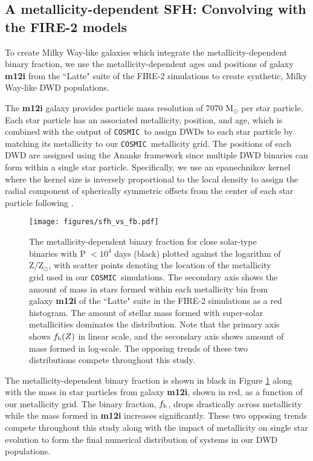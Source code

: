 \documentclass[twocolumn, linenumbers]{aastex631}
\newcommand{\cosmic}{\texttt{COSMIC}}
\begin{document}
\subsection{A metallicity-dependent SFH: Convolving with the FIRE-2 models}
\label{sec:FIRE}
To create Milky Way-like galaxies which integrate the metallicity-dependent binary fraction, we use the metallicity-dependent ages and positions of galaxy \textbf{m12i} from the ``Latte" suite of the FIRE-2 simulations \citep{Hopkins2015, Wetzel2016, Hopkins2018} to create synthetic, Milky Way-like DWD populations. 

The \textbf{m12i} galaxy provides particle mass resolution of 7070 M$_\odot$ per star particle. Each star particle has an associated metallicity, position, and age, which is combined with the output of \cosmic\ to assign DWDs to each star particle by matching its metallicity to our \cosmic\ metallicity grid. The positions of each DWD are assigned using the Ananke framework since multiple DWD binaries can form within a single star particle. Specifically, we use an epanechnikov kernel where the kernel size is inversely proportional to the local density to assign the radial component of spherically symmetric offsets from the center of each star particle following \citet{Sanderson2020}. 

\begin{figure}
	\texttt{[image: figures/sfh\_vs\_fb.pdf]}
    \caption{The metallicity-dependent binary fraction for close solar-type binaries with P $< 10^4$ days (black) plotted against the logarithm of Z/Z$_\odot$, with scatter points denoting the location of the metallicity grid used in our \cosmic\ simulations. The secondary axis shows the amount of mass in stars formed within each metallicity bin from galaxy \textbf{m12i} of the ``Latte" suite in the FIRE-2 simulations as a red histogram. The amount of stellar mass formed with super-solar metallicities dominates the distribution. Note that the primary axis shows $f_{\rm{b}}(Z)$ in linear scale, and the secondary axis shows amount of mass formed in log-scale. The opposing trends of these two distributions compete throughout this study.}
    \label{fig:sfh_vs_fb}
\end{figure}

The metallicity-dependent binary fraction is shown in black in Figure \ref{fig:sfh_vs_fb} along with the mass in star particles from galaxy \textbf{m12i}, shown in red, as a function of our metallicity grid. The binary fraction, $f_{\rm{b}}$, drops drastically across metallicity while the mass formed in \textbf{m12i} increases significantly. These two opposing trends compete throughout this study along with the impact of metallicity on single star evolution to form the final numerical distribution of systems in our DWD populations. 
\end{document}
